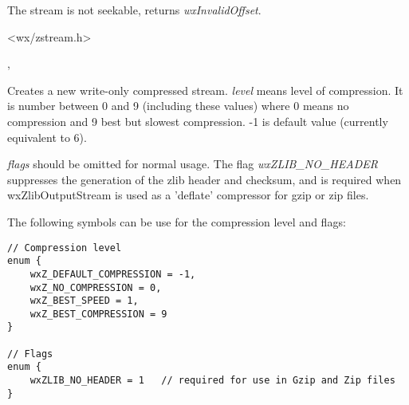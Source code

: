 The stream is not seekable,  returns
 {\it wxInvalidOffset}.




<wx/zstream.h>


,





Creates a new write-only compressed stream. {\it level} means level of 
compression. It is number between 0 and 9 (including these values) where
0 means no compression and 9 best but slowest compression. -1 is default
value (currently equivalent to 6).

{\it flags} should be omitted for normal usage. The flag {\it wxZLIB\_NO_HEADER}
 suppresses the generation of the zlib header and checksum, and is required
when wxZlibOutputStream is used as a 'deflate' compressor for gzip or zip files.

The following symbols can be use for the compression level and flags:

\begin{verbatim}
// Compression level
enum {
    wxZ_DEFAULT_COMPRESSION = -1,
    wxZ_NO_COMPRESSION = 0,
    wxZ_BEST_SPEED = 1,
    wxZ_BEST_COMPRESSION = 9
}

// Flags
enum {
    wxZLIB_NO_HEADER = 1   // required for use in Gzip and Zip files
}
\end{verbatim}

